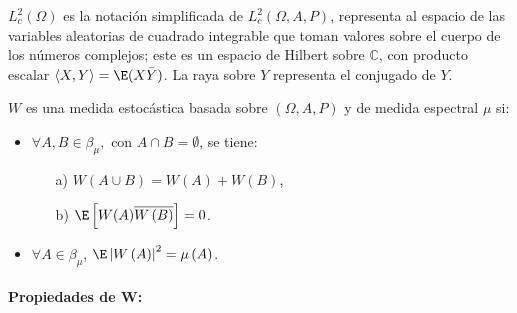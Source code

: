 $L_{c}^{2}\left( \Omega  \right)$ es la notaci\'{o}n simplificada de $L_{c}^{2}\left( \Omega ,A,P \right)$, representa al espacio de las variables aleatorias de cuadrado integrable que toman valores sobre el cuerpo de los n\'{u}meros complejos; este es un espacio de Hilbert sobre $\mathbb{C}$, con producto escalar $\langle X,Y\rangle=\E(X\bar{Y})$. La raya sobre $Y$ representa el conjugado de $Y$.

\begin{definicion}
$W$ es una medida estoc\'{a}stica basada sobre $\left( \Omega,A,P \right)$ y de medida espectral $\mu $ si:
\begin{itemize}
\item $\forall A,B\in \beta_{\mu },$ con $A\cap B=\emptyset $, se tiene:
	\begin{enumerate}
	\item[a)] $W\left( A\cup B \right)=W\left( A \right)+W\left( B \right)$,
	\item[b)] $\E\left[ W(A)\overline{W\left( B \right)} \right]=0$.
	\end{enumerate}
\item $\forall A\in \beta_{\mu }$, $\E\left| W\left( A \right) \right|^{2}=\mu \left( A \right)$.
\end{itemize}
\end{definicion}

\paragraph{Propiedades de W:}

